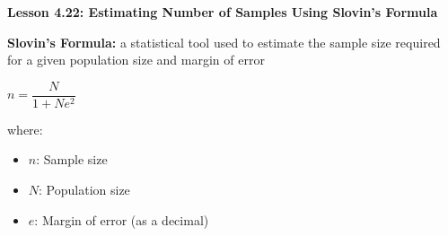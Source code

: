 \begin{center}
\textbf{Lesson 4.22: Estimating Number of Samples Using Slovin's Formula}
\end{center}

\vspace*{-1.5ex}

\noindent\textbf{Slovin’s Formula:} a statistical tool used to estimate the sample size required for a given population size and margin of error%

{\centering $ n = \dfrac{N}{1 + N e^2} $\par}

\noindent where:
\begin{itemize}
    \item \(n\): Sample size
    \item \(N\): Population size
    \item \(e\): Margin of error (as a decimal)
\end{itemize}

